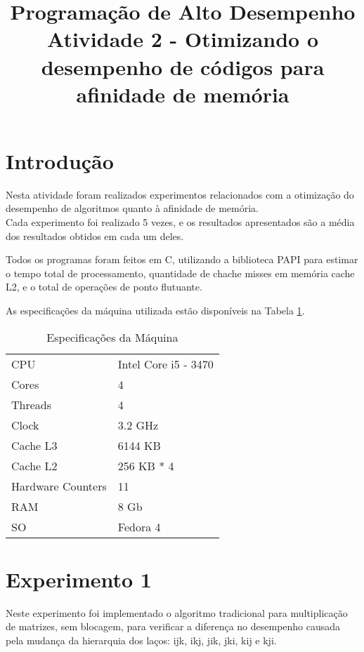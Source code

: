 \documentclass[conference]{IEEEtran}
\begin{document}
\title{Programação de Alto Desempenho\\
\large Atividade 2 - Otimizando o desempenho de códigos para afinidade de memória}

\author{
 }

\maketitle


\section{Introdução}
Nesta atividade foram realizados experimentos relacionados com a otimização do desempenho de algoritmos quanto à afinidade de memória.\\
Cada experimento foi realizado 5 vezes, e os resultados apresentados são a média dos resultados obtidos em cada um deles.

Todos os programas foram feitos em C, utilizando a biblioteca PAPI para estimar o tempo total de processamento, quantidade de chache misses em memória cache L2, e o total de operações de ponto flutuante.

As especificações da máquina utilizada estão disponíveis na Tabela \ref{tab:cpu}.

\begin{table}[h]
\centering
\caption{Especificações da Máquina}
\label{tab:cpu}
\begin{tabular}{ll}
 CPU & Intel Core i5 - 3470\\
 Cores & 4\\
 Threads & 4\\
 Clock & 3.2 GHz\\
 Cache L3 & 6144 KB \\
 Cache L2 & 256 KB * 4 \\
 Hardware Counters & 11 \\
 RAM & 8 Gb \\
 SO & Fedora 4
\end{tabular}
\end{table}

\section{Experimento 1}
Neste experimento foi implementado o algoritmo tradicional para multiplicação de matrizes, sem blocagem, para verificar a diferença no desempenho causada pela mudança da hierarquia dos laços: ijk, ikj, jik, jki, kij e kji.
\end{document}
